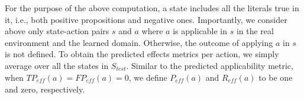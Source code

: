 \documentclass[letterpaper]{article} %
\newcommand{\eff}{\ensuremath{\textit{eff}}\xspace}
\newcommand{\realm}{{\ensuremath{M^*}}\xspace}
\newcommand{\stest}{\ensuremath{S_{\textit{test}}}\xspace}
\newif\ifaddcomments
\newcommand{\roni}[1]{\ifaddcomments{\textcolor{red}{[Roni: #1]}}\fi}
\newcommand{\argaman}[1]{\ifaddcomments{\textcolor{blue}{[Argaman: #1]}}\fi}
\newcommand{\gregor}[1]{\ifaddcomments{\textcolor{orange}{[Gregor: #1]}}\fi}
\newcommand{\cm}[1]{\ifaddcomments{\textcolor{olive}{[Christian: #1]}}\fi}
\newcommand{\leo}[1]{\ifaddcomments{\textcolor{pink}{[Leonardo: #1]}}\fi}
\begin{document}
For the purpose of the above computation, a state includes all the literals true in it, i.e., both positive propositions and negative ones. 
Importantly, we consider above only state-action pairs $s$ and $a$ where $a$ is applicable in $s$ in the real environment and the learned domain. 
Otherwise, the outcome of applying $a$ in $s$ is not defined. 
To obtain the predicted effects metrics per action, we simply average over all the states in $\stest$. Similar to the predicted applicability metric, when $TP_{\eff}(a)=FP_{\eff}(a)=0$, we define $P_{\eff}(a)$ and $R_{\eff}(a)$ to be one and zero, respectively.
\end{document}
